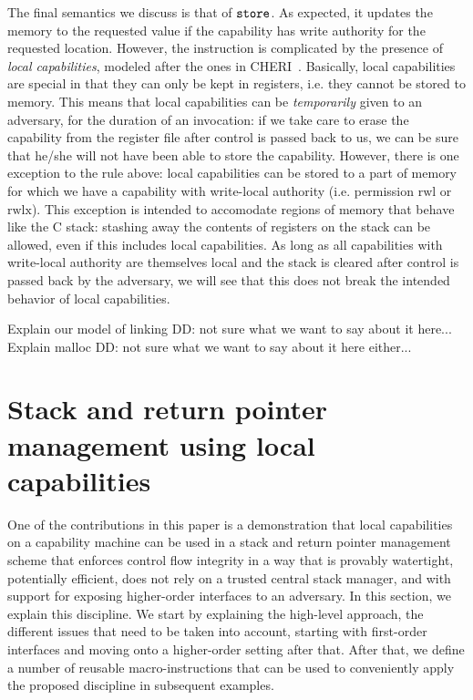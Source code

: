 \documentclass[compsoc,conference,letterpaper,fleqn]{IEEEtran}
\newcommand\dominique[1]{{\color{purple} \sf \footnotesize {DD: #1}}\\}
\newcommand{\zinstr}[1]{\mathtt{#1}}
\newcommand{\twoinstr}[3]{
  \ifthenelse{\equal{#2#3}{}}
  {\zinstr{#1}}
  {\zinstr{#1} \; #2 \; #3}
}
\newcommand{\store}[2]{\twoinstr{store}{#1}{#2}}
\newcommand{\plainperm}[1]{\mathrm{#1}}
\newcommand{\readwritel}{\plainperm{rwl}}
\newcommand{\rwl}{\readwritel}
\newcommand{\rwlx}{\plainperm{rwlx}}
\begin{document}
The final semantics we discuss is that of $\store{}{}$. As expected, it updates
the memory to the requested value if the capability has write authority for the
requested location. However, the instruction is complicated by the presence of
\emph{local capabilities}, modeled after the ones in
CHERI~\cite{Watson2015Cheri}. Basically, local capabilities are special in that
they can only be kept in registers, i.e. they cannot be stored to memory. This
means that local capabilities can be \emph{temporarily} given to an adversary,
for the duration of an invocation: if we take care to erase the capability from
the register file after control is passed back to us, we can be sure that he/she
will not have been able to store the capability. However, there is one exception
to the rule above: local capabilities can be stored to a part of memory for
which we have a capability with write-local authority (i.e. permission $\rwl$ or
$\rwlx$). This exception is intended to accomodate regions of memory that behave
like the C stack: stashing away the contents of registers on the stack can be
allowed, even if this includes local capabilities. As long as all capabilities
with write-local authority are themselves local and the stack is cleared after
control is passed back by the adversary, we will see that this does not break
the intended behavior of local capabilities.


Explain our model of linking
\dominique{not sure what we want to say about it here...}

Explain malloc
\dominique{not sure what we want to say about it here either...}

\section{Stack and return pointer management using local capabilities}

One of the contributions in this paper is a demonstration that local
capabilities on a capability machine can be used in a stack and return pointer
management scheme that enforces control flow integrity in a way that is provably
watertight, potentially efficient, does not rely on a trusted central stack
manager, and with support for exposing higher-order interfaces to an adversary.
In this section, we explain this discipline. We start by explaining the
high-level approach, the different issues that need to be taken into account,
starting with first-order interfaces and moving onto a higher-order setting
after that. After that, we define a number of reusable macro-instructions that
can be used to conveniently apply the proposed discipline in subsequent
examples.
\end{document}
